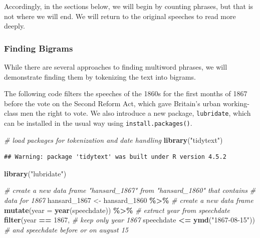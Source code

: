 \documentclass[
]{article}
\newenvironment{Shaded}{\begin{snugshade}}{\end{snugshade}}
\newcommand{\AttributeTok}[1]{\textcolor[rgb]{0.13,0.29,0.53}{#1}}
\newcommand{\CommentTok}[1]{\textcolor[rgb]{0.56,0.35,0.01}{\textit{#1}}}
\newcommand{\DecValTok}[1]{\textcolor[rgb]{0.00,0.00,0.81}{#1}}
\newcommand{\FunctionTok}[1]{\textcolor[rgb]{0.13,0.29,0.53}{\textbf{#1}}}
\newcommand{\NormalTok}[1]{#1}
\newcommand{\OtherTok}[1]{\textcolor[rgb]{0.56,0.35,0.01}{#1}}
\newcommand{\SpecialCharTok}[1]{\textcolor[rgb]{0.81,0.36,0.00}{\textbf{#1}}}
\newcommand{\StringTok}[1]{\textcolor[rgb]{0.31,0.60,0.02}{#1}}
\begin{document}
Accordingly, in the sections below, we will begin by counting phrases,
but that is not where we will end. We will return to the original
speeches to read more deeply.

\subsubsection{Finding Bigrams}\label{finding-bigrams}

While there are several approaches to finding multiword phrases, we will
demonstrate finding them by tokenizing the text into bigrams.

The following code filters the speeches of the 1860s for the first
months of 1867 before the vote on the Second Reform Act, which gave
Britain's urban working-class men the right to vote. We also introduce a
new package, \texttt{lubridate}, which can be installed in the usual way
using \texttt{install.packages()}.

\begin{Shaded}
\begin{Highlighting}[]
\CommentTok{\# load packages for tokenization and date handling}
\FunctionTok{library}\NormalTok{(}\StringTok{"tidytext"}\NormalTok{)   }
\end{Highlighting}
\end{Shaded}

\begin{verbatim}
## Warning: package 'tidytext' was built under R version 4.5.2
\end{verbatim}

\begin{Shaded}
\begin{Highlighting}[]
\FunctionTok{library}\NormalTok{(}\StringTok{"lubridate"}\NormalTok{)  }

\CommentTok{\# create a new data frame "hansard\_1867" from "hansard\_1860" that contains}
\CommentTok{\# data for 1867 }
\NormalTok{hansard\_1867 }\OtherTok{\textless{}{-}}\NormalTok{ hansard\_1860 }\SpecialCharTok{\%\textgreater{}\%} \CommentTok{\# create a new data frame}
  \FunctionTok{mutate}\NormalTok{(}\AttributeTok{year =} \FunctionTok{year}\NormalTok{(speechdate)) }\SpecialCharTok{\%\textgreater{}\%} \CommentTok{\# extract year from speechdate}
  \FunctionTok{filter}\NormalTok{(year }\SpecialCharTok{==} \DecValTok{1867}\NormalTok{, }\CommentTok{\# keep only year 1867}
\NormalTok{         speechdate }\SpecialCharTok{\textless{}=} \FunctionTok{ymd}\NormalTok{(}\StringTok{"1867{-}08{-}15"}\NormalTok{)) }\CommentTok{\# and speechdate before or on august 15}
\end{Highlighting}
\end{Shaded}
\end{document}

